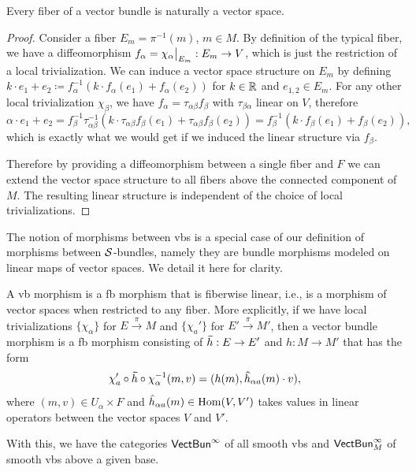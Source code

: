 \begin{prop}
    Every fiber of a vector bundle is naturally a vector space.
\end{prop}
\begin{proof}
    Consider a fiber $E_m=\pi^{-1}(m)$, $m\in M$. By definition of the typical fiber, we have a diffeomorphism $f_\alpha=\restr{\chi_\alpha}{E_m}:E_m\to V$, which is just the restriction of a local trivialization. We can induce a vector space structure on $E_m$ by defining $k\cdot e_1+e_2\coloneqq f_\alpha^{-1}(k\cdot f_\alpha(e_1)+f_\alpha(e_2))$ for $k\in \mathbb{R} $ and $e_{1,2}\in E_m$. For any other local trivialization $\chi_\beta$, we have $f_\alpha=\tau_{\alpha\beta}f_\beta$ with $\tau_{\beta\alpha}$ linear on $V$, therefore 
    \[
    \alpha\cdot e_1+e_2=f_\beta^{-1}\tau_{\alpha\beta}^{-1}(k\cdot \tau_{\alpha\beta}f_\beta(e_1)+\tau_{\alpha\beta}f_\beta(e_2))=f_\beta^{-1}(k\cdot f_\beta(e_1)+f_\beta(e_2)),
    \] 
    which is exactly what we would get if we induced the linear structure via $f_\beta$.
    
    Therefore by providing a diffeomorphism between a single fiber and $F$ we can extend the vector space structure to all fibers above the connected component of $M$. The resulting linear structure is independent of the choice of local trivializations.
\end{proof}

The notion of morphisms between \glspl{vb} is a special case of our definition of morphisms between $\mathcal{S}$-bundles, namely they are bundle morphisms modeled on linear maps of vector spaces. We detail it here for clarity.

\begin{defn}
    A \gls{vb} morphism is a \gls{fb} morphism that is fiberwise linear, i.e., is a morphism of vector spaces when restricted to any fiber. More explicitly, if we have  local trivializations $\{\chi_\alpha\}$ for $E\overset{\pi}{\to}M$ and $\{\chi_a'\}$ for $E'\overset{\pi}{\to}M'$, then a vector bundle morphism is a \gls{fb} morphism consisting of $\wt{h}:E\to E'$ and $h:M\to M'$ that has the form 
    \[\chi_a '\circ \wt{h} \circ \chi_\alpha^{-1}(m,v)=(h(m),\wh{h}_{\alpha a}(m)\cdot v),\]
    where $(m,v)\in U_\alpha\times F$ and $\wh{h}_{\alpha a}(m)\in \Hom(V,V')$ takes values in linear operators between the vector spaces $V$ and $V'$.

    With this, we have the categories $\mathsf{VectBun}^\infty $ of all smooth \glspl{vb} and $\mathsf{VectBun}^\infty_M$ of smooth \glspl{vb} above a given base.
\end{defn}


